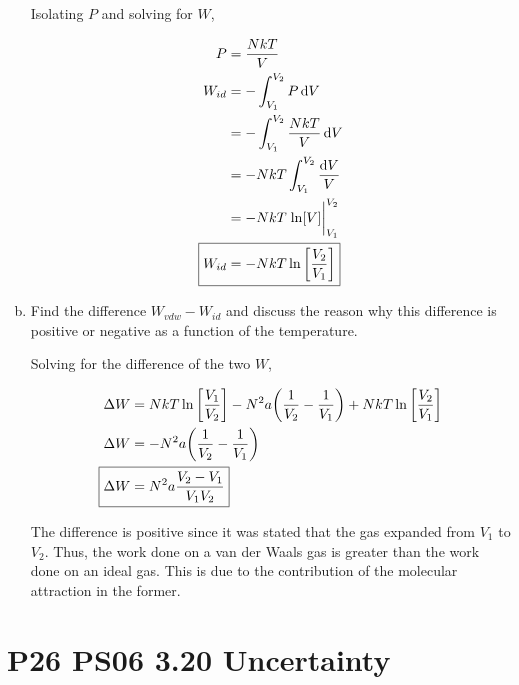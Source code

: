 \documentclass[9pt,a4paper,twocolumn]{article}
\begin{document}
\begin{enumerate}[(a)]
Isolating $P$ and solving for $W$,

\begin{align}
	P &= \frac{NkT}{V} \\
	W_{id} &= -\int_{V_1}^{V_2} P \dd{V} \\
	&= -\int_{V_1}^{V_2} \frac{NkT}{V} \dd{V} \\
	&= -NkT \int_{V_1}^{V_2} \frac{\dd{V}}{V} \\
	&= -NkT\eval{\ln[V]}_{V_1}^{V_2} \\
	\Aboxed{
		W_{id} &= -NkT\ln\qty[\frac{V_2}{V_1}]
	}
\end{align}

\item Find the difference $W_{vdw} - W_{id}$ and discuss the reason why this difference is positive or negative as a function of the temperature.

Solving for the difference of the two $W$,

\begin{align}
	\Delta W &= NkT\ln\qty[\frac{V_1}{V_2}] - N^2a\qty(\frac{1}{V_2} - \frac{1}{V_1}) + NkT\ln\qty[\frac{V_2}{V_1}] \nonumber \\
	\Delta W &= -N^2a\qty(\frac{1}{V_2} - \frac{1}{V_1}) \\
	\Aboxed{
		\Delta W &= N^2 a \frac{V_2 - V_1}{V_1V_2}
	}
\end{align}

The difference is positive since it was stated that the gas expanded from $V_1$ to $V_2$. Thus, the work done on a van der Waals gas is greater than the work done on an ideal gas. This is due to the contribution of the molecular attraction in the former.

\end{enumerate}

\section{P26 PS06 3.20 Uncertainty}
\end{document}
